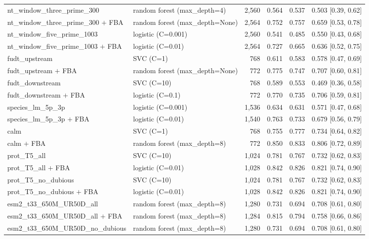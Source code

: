 \begin{longtable}{@{}llrrrl@{}}
    nt\_window\_three\_prime\_300 & random forest (max\_depth=4) & 2,560 & 0.564 & 0.537 & 0.503 [0.39, 0.62] \\
    nt\_window\_three\_prime\_300 $+$ FBA & random forest (max\_depth=None) & 2,564 & 0.752 & 0.757 & 0.659 [0.53, 0.78] \\
    nt\_window\_five\_prime\_1003 & logistic (C=0.001) & 2,560 & 0.541 & 0.485 & 0.550 [0.43, 0.68] \\
    nt\_window\_five\_prime\_1003 $+$ FBA & logistic (C=0.01) & 2,564 & 0.727 & 0.665 & 0.636 [0.52, 0.75] \\
    fudt\_upstream & SVC (C=1) & 768 & 0.611 & 0.583 & 0.578 [0.47, 0.69] \\
    fudt\_upstream $+$ FBA & random forest (max\_depth=None) & 772 & 0.775 & 0.747 & 0.707 [0.60, 0.81] \\
    fudt\_downstream & SVC (C=10) & 768 & 0.589 & 0.553 & 0.469 [0.36, 0.58] \\
    fudt\_downstream $+$ FBA & logistic (C=0.1) & 772 & 0.770 & 0.735 & 0.706 [0.59, 0.81] \\
    species\_lm\_5p\_3p & logistic (C=0.001) & 1,536 & 0.634 & 0.631 & 0.571 [0.47, 0.68] \\
    species\_lm\_5p\_3p $+$ FBA & logistic (C=0.01) & 1,540 & 0.763 & 0.733 & 0.679 [0.56, 0.79] \\
    calm & SVC (C=1) & 768 & 0.755 & 0.777 & 0.734 [0.64, 0.82] \\
    calm $+$ FBA & random forest (max\_depth=8) & 772 & 0.850 & 0.833 & 0.806 [0.72, 0.89] \\
    prot\_T5\_all & SVC (C=10) & 1,024 & 0.781 & 0.767 & 0.732 [0.62, 0.83] \\
    prot\_T5\_all $+$ FBA & logistic (C=0.01) & 1,028 & 0.842 & 0.826 & 0.821 [0.74, 0.90] \\
    prot\_T5\_no\_dubious & SVC (C=10) & 1,024 & 0.781 & 0.767 & 0.732 [0.62, 0.83] \\
    prot\_T5\_no\_dubious $+$ FBA & logistic (C=0.01) & 1,028 & 0.842 & 0.826 & 0.821 [0.74, 0.90] \\
    esm2\_t33\_650M\_UR50D\_all & random forest (max\_depth=8) & 1,280 & 0.731 & 0.694 & 0.708 [0.61, 0.80] \\
    esm2\_t33\_650M\_UR50D\_all $+$ FBA & random forest (max\_depth=8) & 1,284 & 0.815 & 0.794 & 0.758 [0.66, 0.86] \\
    esm2\_t33\_650M\_UR50D\_no\_dubious & random forest (max\_depth=8) & 1,280 & 0.731 & 0.694 & 0.708 [0.61, 0.80] \\

\end{longtable}

